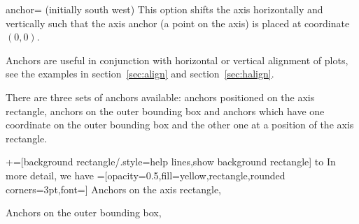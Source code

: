 \begin{pgfplotskey}{anchor= (initially south west)}
\label{option:anchor}%
This option shifts the axis horizontally and vertically such that the axis anchor (a point on the axis) is placed at coordinate $(0,0)$.

Anchors are useful in conjunction with horizontal or vertical alignment of plots, see the examples in section~\ref{sec:align} and section~\ref{sec:halign}.

There are three sets of anchors available: anchors positioned on the axis rectangle, anchors on the outer bounding box and anchors which have one coordinate on the outer bounding box and the other one at a position of the axis rectangle.

{%
+=[background rectangle/.style={help lines},show background rectangle]%
 to \plottable
\def\plot{%
	\begin{axis}[
		width=5cm,
		name=test plot,
		xlabel=$x$,
		ylabel={$y$},%
		y label style={yshift=-15pt},
		legend style={at={(1.03,1)},anchor=north west},
		title=A test plot.
	]
		\addplot table from{\plottable};
		\addlegendentry{$f(x)$}
		\addplot[red] plot[id=gnuplot_ppp,domain=-40:40,samples=120] function{10000*sin(x/3)};
		\addlegendentry{$g(x)$}
	\end{axis}
}%
\def\showit#1#2{%
	\node[pin=#2:(s.#1),fill=black,circle,scale=0.3] at (test plot.#1) {};
}%
In more detail, we have
=[opacity=0.5,fill=yellow,rectangle,rounded corners=3pt,font=\tiny]
Anchors on the axis rectangle,
		\begin{center}
		\end{center}
Anchors on the outer bounding box,
		\begin{center}
\end{center}}
\end{pgfplotskey}
